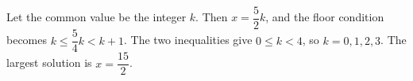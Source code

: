 Let the common value be the integer $k$. Then $x=\dfrac{5}{2}k$, and the floor condition becomes $k\le\dfrac{5}{4}k<k+1$. The two inequalities give $0\le k<4$, so $k=0,1,2,3$. The largest solution is $\boxed{x=\dfrac{15}{2}}$.
